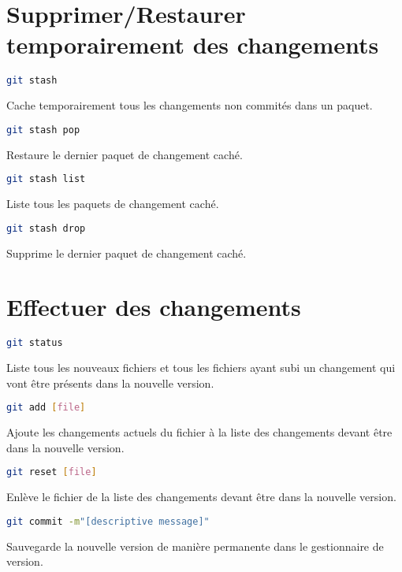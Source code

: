 \documentclass[10pt,landscape]{article}
\begin{document}
\begin{multicols}{3}
\section{Supprimer/Restaurer temporairement des changements}
\begin{lstlisting}[language=bash]
git stash
\end{lstlisting}
Cache temporairement tous les changements non commités dans un paquet.
\begin{lstlisting}[language=bash]
git stash pop
\end{lstlisting}
Restaure le dernier paquet de changement caché.
\begin{lstlisting}[language=bash]
git stash list
\end{lstlisting}
Liste tous les paquets de changement caché.
\begin{lstlisting}[language=bash]
git stash drop
\end{lstlisting}
Supprime le dernier paquet de changement caché.

\section{Effectuer des changements}
\begin{lstlisting}[language=bash]
git status
\end{lstlisting}
Liste tous les nouveaux fichiers et tous les fichiers ayant subi un changement qui vont être présents dans la nouvelle version.
\begin{lstlisting}[language=bash]
git add [file]
\end{lstlisting}
Ajoute les changements actuels du fichier à la liste des changements devant être dans la nouvelle version.
\begin{lstlisting}[language=bash]
git reset [file]
\end{lstlisting}
Enlève le fichier de la liste des changements devant être dans la nouvelle version.
\begin{lstlisting}[language=bash]
git commit -m"[descriptive message]"
\end{lstlisting}
Sauvegarde la nouvelle version de manière permanente dans le gestionnaire de version.


\end{multicols}
\end{document}
